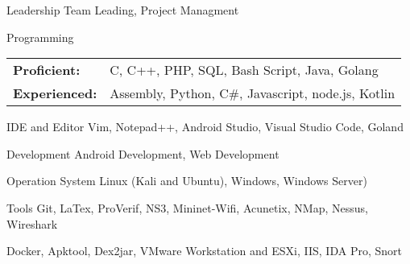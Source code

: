 

\begin{cvskills}

    \cvskill
    {Leadership}
    {Team Leading, Project Managment}
    
    \cvskill
    {Programming}
    {
        \setlength{\tabcolsep}{5pt}
        \begin{tabular}{|l l}
            \textbf{Proficient:} & C, C++, PHP, SQL, Bash Script, Java, Golang \\ 
            \textbf{Experienced:} & Assembly, Python, C\#, Javascript, node.js, Kotlin 
        \end{tabular}
    }

    \cvskill
    {IDE and Editor}
    {Vim, Notepad++, Android Studio, Visual Studio Code, Goland}
    
    \cvskill
    {Development}
    {Android Development, Web Development}
    
    \cvskill
    {Operation System}
    {Linux (Kali and Ubuntu), Windows, Windows Server)}

    \cvskill
    {Tools}
    {Git, LaTex, ProVerif, NS3, Mininet-Wifi, Acunetix, NMap, Nessus, Wireshark}
    
    \cvskill
    {}
    {Docker, Apktool, Dex2jar, VMware Workstation and ESXi, IIS, IDA Pro, Snort}

    

\end{cvskills}

